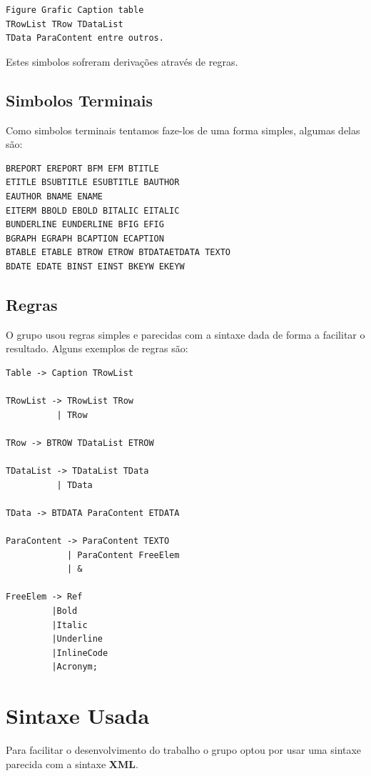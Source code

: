 \documentclass{report}
\begin{document}
\begin{verbatim}
Figure Grafic Caption table 
TRowList TRow TDataList 
TData ParaContent entre outros.
\end{verbatim}
Estes simbolos sofreram derivações através de regras.
\subsection{Simbolos Terminais}
Como simbolos terminais tentamos faze-los de uma forma simples, algumas delas são:

\begin{verbatim}
BREPORT EREPORT BFM EFM BTITLE
ETITLE BSUBTITLE ESUBTITLE BAUTHOR
EAUTHOR BNAME ENAME 
EITERM BBOLD EBOLD BITALIC EITALIC 
BUNDERLINE EUNDERLINE BFIG EFIG 
BGRAPH EGRAPH BCAPTION ECAPTION
BTABLE ETABLE BTROW ETROW BTDATAETDATA TEXTO 
BDATE EDATE BINST EINST BKEYW EKEYW 
\end{verbatim}
\subsection{Regras}
O grupo usou regras simples e parecidas com a sintaxe dada de forma a facilitar o resultado. Alguns exemplos de regras são:
\begin{verbatim}
Table -> Caption TRowList

TRowList -> TRowList TRow
          | TRow
          
TRow -> BTROW TDataList ETROW

TDataList -> TDataList TData
          | TData

TData -> BTDATA ParaContent ETDATA

ParaContent -> ParaContent TEXTO
            | ParaContent FreeElem
            | &

FreeElem -> Ref
         |Bold
	     |Italic
    	 |Underline
	     |InlineCode
	     |Acronym;

\end{verbatim}

\section{Sintaxe Usada}
Para facilitar o desenvolvimento do trabalho o grupo optou por usar uma sintaxe parecida com a sintaxe \textbf{XML}.
\end{document}

